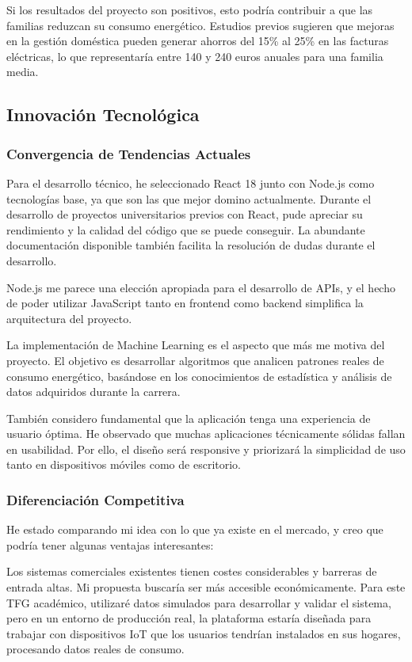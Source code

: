 \documentclass[12pt,a4paper,spanish]{article}
\begin{document}
Si los resultados del proyecto son positivos, esto podría contribuir a que las familias reduzcan su consumo energético. Estudios previos sugieren que mejoras en la gestión doméstica pueden generar ahorros del 15\% al 25\% en las facturas eléctricas, lo que representaría entre 140 y 240 euros anuales para una familia media.

\subsection{Innovación Tecnológica}

\subsubsection{Convergencia de Tendencias Actuales}

Para el desarrollo técnico, he seleccionado React 18 junto con Node.js como tecnologías base, ya que son las que mejor domino actualmente. Durante el desarrollo de proyectos universitarios previos con React, pude apreciar su rendimiento y la calidad del código que se puede conseguir. La abundante documentación disponible también facilita la resolución de dudas durante el desarrollo.

Node.js me parece una elección apropiada para el desarrollo de APIs, y el hecho de poder utilizar JavaScript tanto en frontend como backend simplifica la arquitectura del proyecto.

La implementación de Machine Learning es el aspecto que más me motiva del proyecto. El objetivo es desarrollar algoritmos que analicen patrones reales de consumo energético, basándose en los conocimientos de estadística y análisis de datos adquiridos durante la carrera.

También considero fundamental que la aplicación tenga una experiencia de usuario óptima. He observado que muchas aplicaciones técnicamente sólidas fallan en usabilidad. Por ello, el diseño será responsive y priorizará la simplicidad de uso tanto en dispositivos móviles como de escritorio.

\subsubsection{Diferenciación Competitiva}

He estado comparando mi idea con lo que ya existe en el mercado, y creo que podría tener algunas ventajas interesantes:

Los sistemas comerciales existentes tienen costes considerables y barreras de entrada altas. Mi propuesta buscaría ser más accesible económicamente. Para este TFG académico, utilizaré datos simulados para desarrollar y validar el sistema, pero en un entorno de producción real, la plataforma estaría diseñada para trabajar con dispositivos IoT que los usuarios tendrían instalados en sus hogares, procesando datos reales de consumo.
\end{document}

